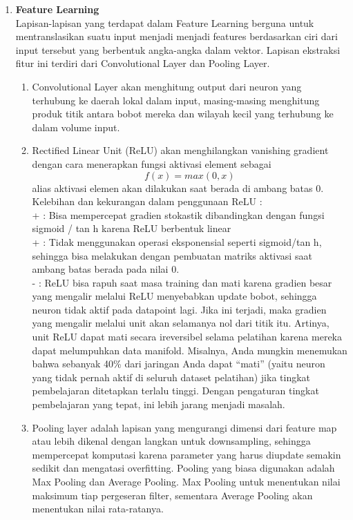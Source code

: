 \documentclass[a4paper]{article}
\begin{document}
			\begin{enumerate}
				\item \textbf {Feature Learning} \\
				\hspace{7mm}Lapisan-lapisan yang terdapat dalam Feature Learning berguna untuk mentranslasikan suatu input menjadi menjadi features berdasarkan ciri dari input tersebut yang berbentuk angka-angka dalam vektor. Lapisan ekstraksi fitur ini terdiri dari Convolutional Layer dan Pooling Layer. 

				\begin{enumerate}
					\item Convolutional Layer akan menghitung output dari neuron yang terhubung ke daerah lokal dalam input, masing-masing menghitung produk titik antara bobot mereka dan wilayah kecil yang terhubung ke dalam volume input.
					
					\item Rectified Linear Unit (ReLU) akan menghilangkan vanishing gradient dengan cara menerapkan fungsi aktivasi element sebagai
					\begin{equation}
						f(x)=max⁡(0,x)
					\end{equation}
					alias aktivasi elemen akan dilakukan saat berada di ambang batas 0. Kelebihan dan kekurangan dalam penggunaan ReLU :\\
					+ : Bisa mempercepat gradien stokastik dibandingkan dengan fungsi sigmoid / tan h karena ReLU berbentuk linear\\
					+ : Tidak menggunakan operasi eksponensial seperti sigmoid/tan h, sehingga bisa melakukan dengan pembuatan matriks aktivasi saat ambang batas berada pada nilai 0.\\
					- : ReLU bisa rapuh saat masa training dan mati karena gradien besar yang mengalir melalui ReLU menyebabkan update bobot, sehingga neuron tidak aktif pada datapoint lagi. Jika ini terjadi, maka gradien yang mengalir melalui unit akan selamanya nol dari titik itu. Artinya, unit ReLU dapat mati secara ireversibel selama pelatihan karena mereka dapat melumpuhkan data manifold. Misalnya, Anda mungkin menemukan bahwa sebanyak 40\% dari jaringan Anda dapat “mati” (yaitu neuron yang tidak pernah aktif di seluruh dataset pelatihan) jika tingkat pembelajaran ditetapkan terlalu tinggi. Dengan pengaturan tingkat pembelajaran yang tepat, ini lebih jarang menjadi masalah.
					
					\item Pooling layer adalah lapisan yang mengurangi dimensi dari feature map atau lebih dikenal dengan langkan untuk downsampling, sehingga mempercepat komputasi karena parameter yang harus diupdate semakin sedikit dan mengatasi overfitting. Pooling yang biasa digunakan adalah Max Pooling dan Average Pooling. Max Pooling untuk menentukan nilai maksimum tiap pergeseran filter, sementara Average Pooling akan menentukan nilai rata-ratanya.
					

\end{enumerate}
\end{enumerate}
\end{document}
